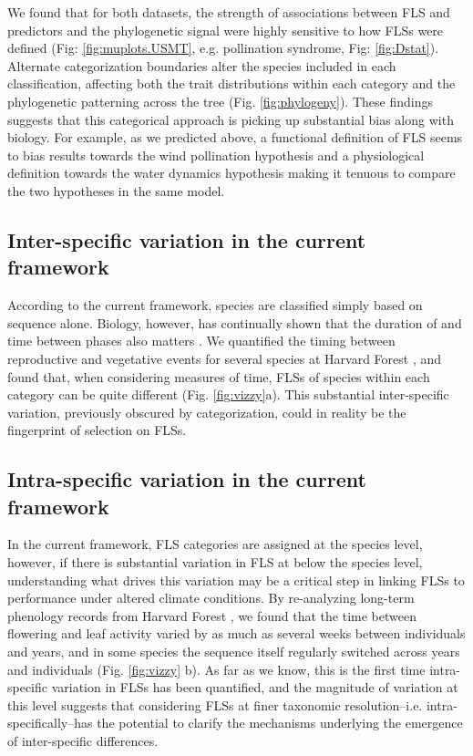 \documentclass{article}
\begin{document}
\noindent We found that for both datasets, the strength of associations between FLS and predictors and the phylogenetic signal were highly sensitive to how FLSs were defined (Fig: \ref{fig:muplots.USMT}, e.g. pollination syndrome, Fig: \ref{fig:Dstat}). Alternate categorization boundaries alter the species included in each classification, affecting both the trait distributions within each category and the phylogenetic patterning across the tree (Fig. \ref{fig:phylogeny}). These findings suggests that this categorical approach is picking up substantial bias along with biology. For example, as we predicted above, a functional definition of FLS seems to bias results towards the wind pollination hypothesis and a physiological definition towards the water dynamics hypothesis making it tenuous to compare the two hypotheses in the same model.  \\ %

\subsection*{Inter-specific variation in the current framework}
\noindent According to the current framework, species are classified simply based on sequence alone. Biology, however, has continually shown that the duration of and time between phases also matters \citep{Inouye2019}. We quantified the timing between reproductive and vegetative events for several species at Harvard Forest \citep{OKeefe2015}, and found that, when considering measures of time, FLSs of species within each category can be quite different (Fig. \ref{fig:vizzy}a). This substantial inter-specific variation, previously obscured by categorization, could in reality be the fingerprint of selection on FLSs.\\ %

\subsection*{Intra-specific variation in the current framework}
\noindent In the current framework, FLS categories are assigned at the species level, however, if there is substantial variation in FLS at below the species level, understanding what drives this variation  may be a critical step in linking FLSs to performance under altered climate conditions. By re-analyzing long-term phenology records from  Harvard Forest \citep{OKeefe2015}, we found that the time between flowering and leaf activity varied by as much as several weeks between individuals and years, and in some species the sequence itself regularly switched across years and individuals  (Fig. \ref{fig:vizzy} b). As far as we know, this is the first time intra-specific variation in FLSs has been quantified, and the magnitude of variation at this level suggests that considering FLSs at finer taxonomic resolution--i.e. intra-specifically--has the potential to clarify the mechanisms underlying the emergence of inter-specific differences.\\
\end{document}

